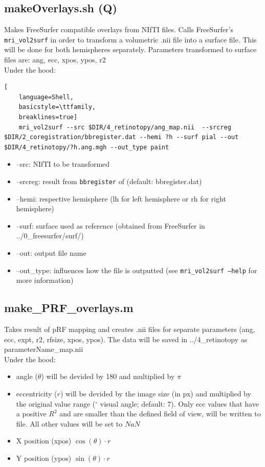 \documentclass[12pt,a4paper]{scrartcl}
\begin{document}
\subsection{makeOverlays.sh (Q)}
\label{sh:mkOver}
Makes FreeSurfer compatible overlays from NIfTI files. Calls FreeSurfer's \texttt{mri\_vol2surf} in order to transform a volumetric .nii file into a surface file. This will be done for both hemispheres separately. Parameters transformed to surface files are: ang, ecc, xpos, ypos, r2\\

\noindent Under the hood:
\begin{lstlisting}[
    language=Shell,
    basicstyle=\ttfamily,
    breaklines=true]
    mri_vol2surf --src $DIR/4_retinotopy/ang_map.nii  --srcreg $DIR/2_coregistration/bbregister.dat --hemi ?h --surf pial --out $DIR/4_retinotopy/?h.ang.mgh --out_type paint
\end{lstlisting}
\begin{itemize}
\item --src: NIfTI to be transformed
\item --srcreg: result from \texttt{bbregister} of \texttt{} (default: bbregister.dat)
\item --hemi: respective hemisphere (lh for left hemisphere or rh for right hemisphere)
\item --surf: surface used as reference (obtained from FreeSurfer in ../0\_freesurfer/surf/)
\item --out: output file name
\item --out\_type: influences how the file is outputted (see \texttt{mri\_vol2surf --help} for more information)
\end{itemize}

\subsection{make\_PRF\_overlays.m}
\label{m:mkprfO}
Takes result of pRF mapping and creates .nii files for separate parameters (ang, ecc, expt, r2, rfsize, xpos, ypos). The data will be saved in ../4\_retinotopy as parameterName\_map.nii\\

\noindent Under the hood:
\begin{itemize}
\item angle ($\theta$) will be devided by 180 and multiplied by $\pi$
\item eccentricity ($r$) will be devided by the image size (in px) and multiplied by the original value range ($^\circ$ visual angle; default: 7). Only ecc values that have a positive $R^2$ and are smaller than the defined field of view, will be written to file. All other values will be set to $NaN$
\item X position (xpos) $\cos(\theta)\cdotp r$
\item Y position (ypos) $\sin(\theta)\cdotp r$
\end{itemize}
\end{document}
